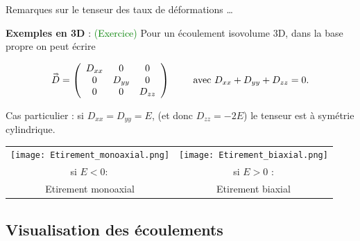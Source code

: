 \begin{frame}{Remarques sur le tenseur des taux de déformations  \ldots}
\small


\medskip
\pause
{\bf Exemples en 3D } :   \textcolor{green}{(Exercice)}
Pour un écoulement isovolume 3D, dans la base propre on peut écrire 
 
\[
\accentset{\Rightarrow}{D} = 
	\left(
	\begin{array}{ccc}
		D_{xx} & 0 & 0 
		\\
		0 & D_{yy} & 0
		\\
		0 & 0 & D_{zz}
	\end{array}
	\right)
\qquad \mbox{ avec } D_{xx}+ D_{yy} + D_{zz} = 0.
\]

Cas particulier : si $D_{xx} = D_{yy} = E$, (et donc $D_{zz} = -2 E$) le tenseur est à symétrie cylindrique.

\begin{center}
\begin{tabular}{cc}
	\texttt{[image: Etirement\_monoaxial.png]}
	&
	\texttt{[image: Etirement\_biaxial.png]}\\
	si $E <0 :$ & si $E>0$  :
	\\ 
	Etirement monoaxial & 
	Etirement biaxial
	\end{tabular}
\end{center}

\end{frame}


\subsection{Visualisation des \'ecoulements}


